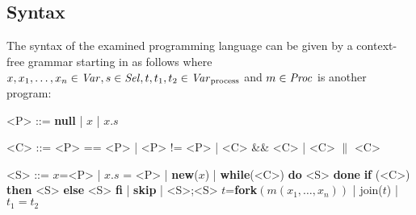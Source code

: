 	\subsection{Syntax}
	\label{sec:syntax}
	The syntax of the examined programming language can be given by a
	context-free grammar starting in  as follows where
	$x,x_1,\dots,x_n\in\mathit{Var}, s\in\mathit{Sel}, t,t_1,t_2\in\mathit{Var}_{\text{process}}$ and $m\in\mathit{Proc}$ is
	another program:
	\setlength{\grammarindent}{2cm}
	\begin{grammar}
	<P> ::= \textbf{null} | $x$ | $x.s$

	<C> ::= <P> == <P> | <P> != <P> | <C> \&\& <C> | <C>  $\|$  <C>

	<S> ::= $x$=<P> | $x.s$ = <P> | \textbf{new}($x$) | \textbf{while}(<C>)
	\textbf{do} <S> \textbf{done}\alt
	\textbf{if} (<C>) \textbf{then} <S> \textbf{else} <S> \textbf{fi} |
	\textbf{skip} | <S>;<S>\alt
	$t$=\textbf{fork}$(m(x_1,\dots,x_n))$ | join($t$) | $t_1 = t_2$
	\end{grammar}

